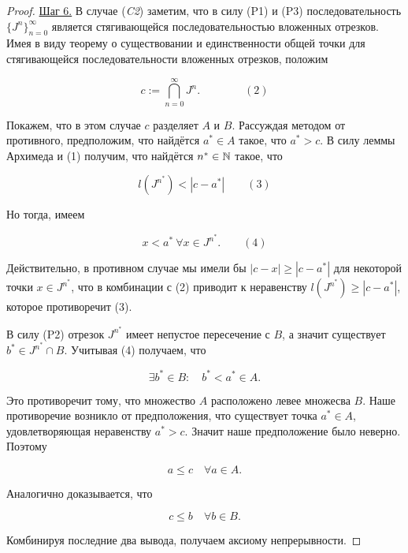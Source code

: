 \begin{proof}
        \underline{Шаг 6.} В случае (\textit{C2}) заметим, что в силу (P1) и (P3) последовательность $\{ J^{n} \}^{\infty}_{n = 0}$ является стягивающейся последовательностью вложенных отрезков. Имея в виду теорему о существовании и единственности общей точки для стягивающейся последовательности вложенных отрезков, положим

        $$\displaystyle c := \bigcap_{n = 0}^{\infty} J^{n}.  \qquad\qquad (2)$$

        Покажем, что в этом случае $c$ разделяет $A$ и $B$. Рассуждая методом от противного, предположим, что найдётся $a^{*} \in A$ такое, что $a^{*} > c.$ В силу леммы Архимеда и (1) получим, что найдётся $n^{*} \in \mathbb{N}$ такое, что

        $$ l(J^{n^{*}}) < |c - a^{*}| \qquad (3)$$

        \newpage
        Но тогда, имеем

        $$ x < a^{*} \  \forall x \in J^{n^{*}}. \qquad (4)$$

        Действительно, в противном случае мы имели бы $|c-x| \geq |c - a^{*}|$ для некоторой точки $x \in J^{n^{*}}$, что в комбинации с (2) приводит к неравенству $l(J^{n^{*}}) \geq |c-a^{*}|$, которое противоречит (3).

        В силу (P2) отрезок $J^{n^{*}}$ имеет непустое пересечение с $B$, а значит существует $b^{*} \in J^{n^{*}} \cap B.$ Учитывая (4) получаем, что

        $$ \exists b^{*} \in B: \quad b^{*} < a^{*} \in A.$$

        Это противоречит тому, что множество $A$ расположено левее множесва $B$. Наше противоречие возникло от предположения, что существует точка $a^{*} \in A$, удовлетворяющая неравенству $a^{*} > c$. Значит наше предположение было неверно. Поэтому

        $$ a \leq c \quad \forall a \in A.$$

        Аналогично доказывается, что

        $$ c \leq b \quad \forall b \in B.$$

        Комбинируя последние два вывода, получаем аксиому непрерывности.
    \end{proof}
